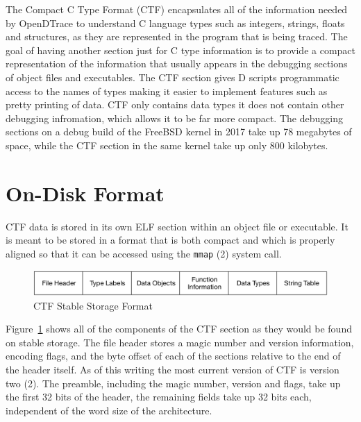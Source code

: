 The Compact C Type Format (CTF) encapsulates all of the information
needed by OpenDTrace to understand C language types such as integers,
strings, floats and structures, as they are represented in the program
that is being traced.  The goal of having another section just for C
type information is to provide a compact representation of the
information that usually appears in the debugging sections of object
files and executables. The CTF section gives D scripts programmatic
access to the names of types making it easier to implement features
such as pretty printing of data.  CTF only contains data types it does
not contain other debugging infromation, which allows it to be far
more compact.  The debugging sections on a debug build of the FreeBSD
kernel in 2017 take up 78 megabytes of space, while the CTF section in
the same kernel take up only 800 kilobytes.

\section{On-Disk Format}
\label{sec:ctf-on-disk-format}

CTF data is stored in its own ELF section within an object file or
executable.  It is meant to be stored in a format that is both compact
and which is properly aligned so that it can be accessed using the
\texttt{mmap} (2) system call.

\begin{figure}[h]
  \centering
  \includegraphics[width=.8\textwidth]{ctf-stable-format}
  \caption{CTF Stable Storage Format}
  \label{fig:ctf-stable-storage-format}
\end{figure}

Figure~\ref{fig:ctf-stable-storage-format} shows all of the components
of the CTF section as they would be found on stable storage.  The file
header stores a magic number and version information, encoding flags,
and the byte offset of each of the sections relative to the end of the
header itself.  As of this writing the most current version of CTF is
version two (2).  The preamble, including the magic number, version
and flags, take up the first 32 bits of the header, the remaining
fields take up 32 bits each, independent of the word size of the
architecture.

